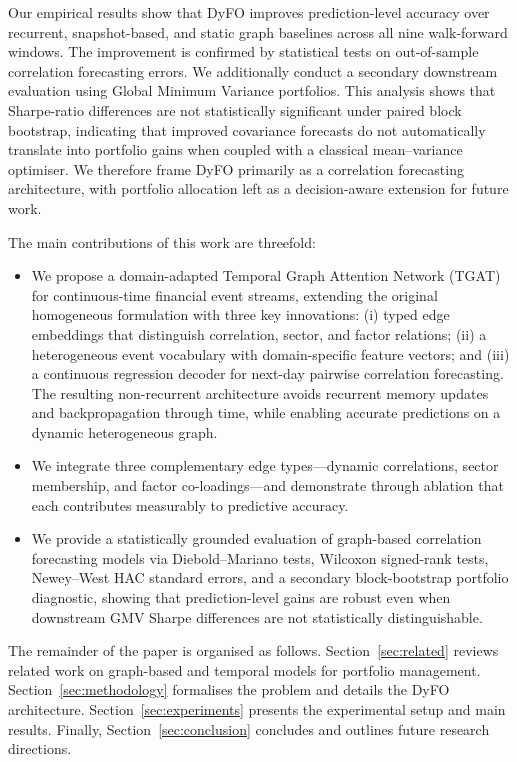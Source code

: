 \documentclass[runningheads]{llncs}
\begin{document}
Our empirical results show that DyFO improves prediction-level accuracy over recurrent, snapshot-based, and static graph baselines across all nine
walk-forward windows. The improvement is confirmed by statistical tests on out-of-sample correlation forecasting errors. We additionally conduct a
secondary downstream evaluation using Global Minimum Variance portfolios. This analysis shows that Sharpe-ratio differences are not statistically
significant under paired block bootstrap, indicating that improved covariance forecasts do not automatically translate into portfolio gains when coupled with a classical mean--variance optimiser. We therefore frame DyFO primarily as a correlation forecasting architecture, with portfolio allocation left as a decision-aware extension for future work.

The main contributions of this work are threefold:
\begin{itemize}
    \item We propose a domain-adapted Temporal Graph Attention Network (TGAT)~\cite{xu2020inductive} for continuous-time financial event
    streams, extending the original homogeneous formulation with three key innovations: (i) typed edge embeddings that distinguish correlation,
    sector, and factor relations; (ii) a heterogeneous event vocabulary with domain-specific feature vectors; and (iii) a continuous regression decoder for next-day pairwise correlation forecasting. The resulting non-recurrent architecture avoids recurrent memory updates and backpropagation through time, while enabling accurate predictions on a dynamic heterogeneous graph.

    \item We integrate three complementary edge types---dynamic correlations, sector membership, and factor co-loadings---and demonstrate through ablation that each contributes measurably to predictive accuracy.

    \item We provide a statistically grounded evaluation of graph-based correlation forecasting models via Diebold--Mariano tests, Wilcoxon
    signed-rank tests, Newey--West HAC standard errors, and a secondary block-bootstrap portfolio diagnostic, showing that prediction-level gains
    are robust even when downstream GMV Sharpe differences are not statistically distinguishable.
\end{itemize}

The remainder of the paper is organised as follows. Section~\ref{sec:related} reviews related work on graph-based and temporal models for portfolio management. Section~\ref{sec:methodology} formalises the problem and details the DyFO architecture. Section~\ref{sec:experiments} presents the experimental setup and main results. Finally, Section~\ref{sec:conclusion} concludes and outlines future research directions.
\end{document}
